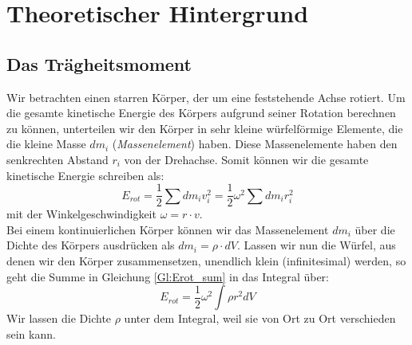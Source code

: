 \section{Theoretischer Hintergrund}

\subsection{Das Trägheitsmoment}

Wir betrachten einen starren Körper, der um eine feststehende Achse rotiert. Um die gesamte kinetische Energie des Körpers aufgrund seiner Rotation berechnen zu können, unterteilen wir den Körper in sehr kleine würfelförmige Elemente, die die kleine Masse $dm_i$ (\textit{Massenelement}) haben. Diese Massenelemente haben den senkrechten Abstand $r_i$ von der Drehachse. Somit können wir die gesamte kinetische Energie schreiben als:
\begin{equation}
\label{Gl:Erot_sum}
E_{rot} = \frac{1}{2} \sum{dm_i v_i^2} = \frac{1}{2} \omega^2 \sum{dm_i r_i^2}
\end{equation}
mit der Winkelgeschwindigkeit $\omega = r\cdot v$.\\
Bei einem kontinuierlichen Körper können wir das Massenelement $dm_i$ über die Dichte des Körpers ausdrücken als $dm_i = \rho\cdot dV$. Lassen wir nun die Würfel, aus denen wir den Körper zusammensetzen, unendlich klein (infinitesimal) werden, so geht die Summe in Gleichung \ref{Gl:Erot_sum} in das Integral über:
\begin{equation}
\label{Gl:Erot_integral}
E_{rot} = \frac{1}{2}\omega^2\int{\rho r^2 dV}
\end{equation}
%
Wir lassen die Dichte $\rho$ unter dem Integral, weil sie von Ort zu Ort verschieden sein kann. \\

